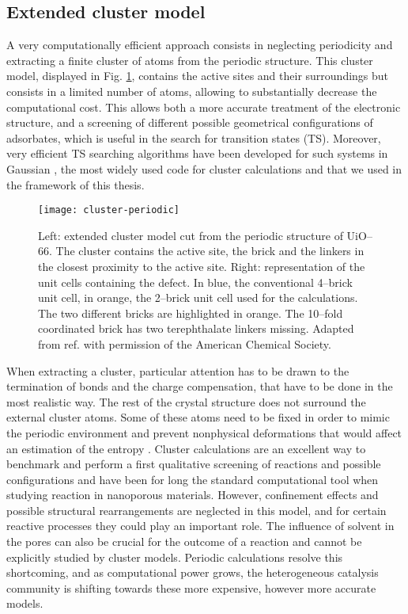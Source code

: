 \subsection*{Extended cluster model}
A very computationally efficient approach consists in neglecting periodicity and extracting a finite cluster of atoms from the periodic structure. This cluster model, displayed in Fig. \ref{fig:cluster-periodic}, contains the active sites and their surroundings but consists in a limited number of atoms, allowing to substantially decrease the computational cost. 
This allows both a more accurate treatment of the electronic structure, and a screening of different possible geometrical configurations of adsorbates, which is useful in the search for transition states (TS). Moreover, very efficient TS searching algorithms have been developed for such systems in Gaussian \cite{frisch2015gaussian}, the most widely used code for cluster calculations and that we used in the framework of this thesis.
\begin{figure}[!htbp]
	\centering
 	\texttt{[image: cluster-periodic]}
	\caption{Left: extended cluster model cut from the periodic structure of UiO--66. The cluster contains the active site, the brick and the linkers in the closest proximity to the active site. Right: representation of the unit cells containing the defect. In blue, the conventional 4--brick unit cell, in orange, the 2--brick unit cell used for the calculations. The two different bricks are highlighted in orange. The 10--fold coordinated brick has two terephthalate linkers missing. Adapted from ref. \cite{caratelli2017nature} with permission of the American Chemical Society.}
	\label{fig:cluster-periodic}
\end{figure}
When extracting a cluster, particular attention has to be drawn to the termination of bonds and the charge compensation, that have to be done in the most realistic way. The rest of the crystal structure does not surround the external cluster atoms. Some of these atoms need to be fixed in order to mimic the periodic environment and prevent nonphysical deformations that would affect an estimation of the entropy \cite{DeWispelaere2018}.
\npar
Cluster calculations are an excellent way to benchmark and perform a first qualitative screening of reactions and possible configurations and have been for long the standard computational tool when studying reaction in nanoporous materials. However, confinement effects and possible structural rearrangements are neglected in this model, and for certain reactive processes they could play an important role. The influence of solvent in the pores can also be crucial for the outcome of a reaction and cannot be explicitly studied by cluster models. Periodic calculations resolve this shortcoming, and as computational power grows, the heterogeneous catalysis community is shifting towards these more expensive, however more accurate models. 

